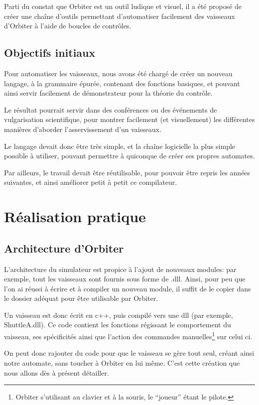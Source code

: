 \documentclass[a4paper,11pt]{article}
\begin{document}
        Parti du constat que Orbiter est un outil ludique et visuel, il a été proposé de créer une chaîne d'outils permettant d'automatiser facilement des vaisseaux d'Orbiter à l'aide de boucles de contrôles.

    \subsection{Objectifs initiaux}
        Pour automatiser les vaisseaux, nous avons été chargé de créer un nouveau langage, à la grammaire épurée, contenant des fonctions basiques, et pouvant ainsi servir facilement de démonstrateur pour la théorie du contrôle.

        Le résultat pourrait servir dans des conférences ou des événements de vulgarisation scientifique, pour montrer facilement (et visuellement) les différentes manières d'aborder l'asservissement d'un vaisseaux.

        Le langage devait donc être très simple, et la chaîne logicielle la plus simple possible à utiliser, pouvant permettre à quiconque de créer ses propres automates.

        Par ailleurs, le travail devait être réutilisable, pour pouvoir être repris les années suivantes, et ainsi améliorer petit à petit ce compilateur.

\section{Réalisation pratique}
    \subsection{Architecture d'Orbiter}
        L'architecture du simulateur est propice à l'ajout de nouveaux modules: par exemple, tout les vaisseaux sont fournis sous forme de .dll. Ainsi, pour peu que l'on ai réussi à écrire et à compiler un nouveau module, il suffit de le copier dans le dossier adéquat pour être utilisable par Orbiter.
        
        Un vaisseau est donc écrit en c++, puis compilé vers une dll (par exemple, ShuttleA.dll). Ce code contient les fonctions régissant le comportement du vaisseau, ses spécificités ainsi que l'action des commandes manuelles\footnote{Orbiter s'utilisant au clavier et à la souris, le "`joueur"' étant le pilote.} sur celui ci.
        
        On peut donc rajouter du code pour que le vaisseau se gère tout seul, créant ainsi notre automate, sans toucher à Orbiter en lui même. C'est cette création que nous allons dès à présent détailler.
\end{document}
